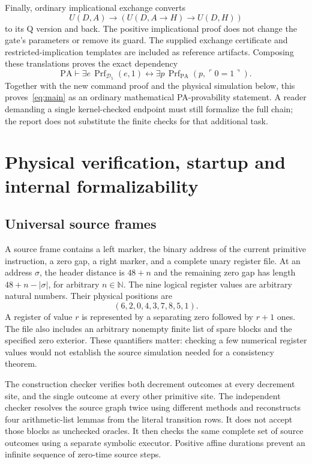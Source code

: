 \documentclass[11pt,letterpaper]{article}
\newcommand{\PA}{\mathrm{PA}}
\newcommand{\Prf}{\operatorname{Prf}}
\begin{document}
Finally, ordinary implicational exchange converts
\[
 U(D,A)\to(U(D,A\to H)\to U(D,H))
\]
to its Q version and back. The positive implicational proof does not
change the gate's parameters or remove its guard. The supplied exchange
certificate and restricted-implication templates are included as reference
artifacts. Composing these translations proves the exact dependency
\[
 \PA\vdash
 \exists e\,\Prf_{\mathcal D_5}(e,1)
 \leftrightarrow
 \exists p\,\Prf_{\PA}(p,\ulcorner0=1\urcorner).
\]
Together with the new command proof and the physical simulation below,
this proves~\eqref{eq:main} as an ordinary mathematical PA-provability
statement. A reader demanding a single kernel-checked endpoint must still
formalize the full chain; the report does not substitute the finite checks
for that additional task.

\section{Physical verification, startup and internal formalizability}
\label{sec:physical}

\subsection{Universal source frames}

A source frame contains a left marker, the binary address of the current
primitive instruction, a zero gap, a right marker, and a complete unary
register file. At an address $\sigma$, the header distance is $48+n$ and
the remaining zero gap has length $48+n-|\sigma|$, for arbitrary $n\in\mathbb N$.
The nine logical register values are arbitrary natural numbers. Their
physical positions are
\[
                   (6,2,0,4,3,7,8,5,1).
\]
A register of value $r$ is represented by a separating zero followed by
$r+1$ ones. The file also includes an arbitrary nonempty finite list of
spare blocks and the specified zero exterior. These quantifiers matter:
checking a few numerical register values would not establish the source
simulation needed for a consistency theorem.

The construction checker verifies both decrement outcomes at every
decrement site, and the single outcome at every other primitive site.
The independent checker resolves the source graph twice using different
methods and reconstructs four arithmetic-list lemmas from the literal
transition rows. It does not accept those blocks as unchecked oracles.
It then checks the same complete set of source outcomes using a separate
symbolic executor. Positive affine durations prevent an infinite sequence
of zero-time source steps.
\end{document}
